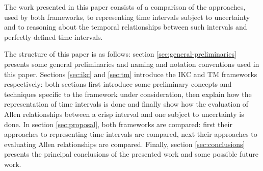 The work presented in this paper consists of a comparison of the approaches, used by both frameworks, to representing time intervals subject to uncertainty and to reasoning about the temporal relationships between such intervals and perfectly defined time intervals. 

The structure of this paper is as follows: section \ref{sec:general-preliminaries} presents some general preliminaries and naming and notation conventions used in this paper. Sections \ref{sec:ikc} and \ref{sec:tm} introduce the IKC and TM frameworks respectively: both sections first introduce some preliminary concepts and techniques specific to the framework under consideration, then explain how the representation of time intervals is done and finally show how the evaluation of Allen relationships between a crisp interval and one subject to uncertainty is done. In section \ref{sec:proposal}, both frameworks are compared: first their approaches to representing time intervals are compared, next their approaches to evaluating Allen relationships are compared. Finally, section \ref{sec:conclusions} presents the principal conclusions of the presented work and some possible future work. 



